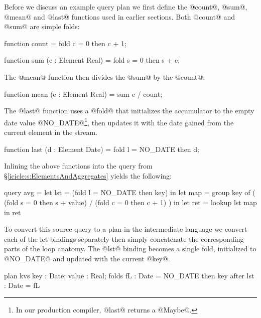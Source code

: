Before we discuss an example query plan we first define the @count@, @sum@, @mean@ and @last@ functions used in earlier sections. Both @count@ and @sum@ are simple folds:
\begin{code}
    function count
     = fold c = 0 then c + 1;

    function sum (e : Element Real)
     = fold s = 0 then s + e;
\end{code}
The @mean@ function then divides the @sum@ by the @count@.
\begin{code}
    function mean (e : Element Real)
     = sum e / count;
\end{code}

The @last@ function uses a @fold@ that initializes the accumulator to the empty date value @NO_DATE@\footnote{In our production compiler, @last@ returns a @Maybe@.}, then updates it with the date gained from the current element in the stream.
\begin{code}
    function last (d : Element Date)
     = fold l = NO_DATE then d;
\end{code}


Inlining the above functions into the query from \S\ref{icicle:s:ElementsAndAggregates} yields the following:
\begin{code}
  query avg
   =    let lst = (fold l = NO_DATE then key)
     in let map = group key of
                  ( (fold s = 0 then s + value)
                  / (fold c = 0 then c + 1) )
     in let ret = lookup lst map
     in     ret
\end{code}

To convert this source query to a plan in the intermediate language we convert each of the let-bindings separately then simply concatenate the corresponding parts of the loop anatomy. The @lst@ binding becomes a single fold, initialized to @NO_DATE@ and updated with the current @key@.
\begin{code}
  plan kvs { key : Date; value : Real;      }
  folds    { fL  : Date = NO_DATE then key  }
  after    { lst : Date = fL                }
\end{code}

